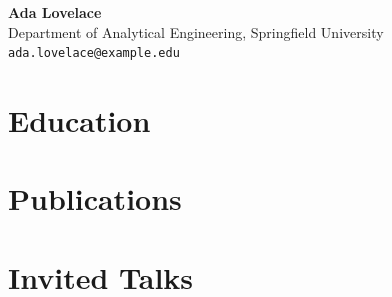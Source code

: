 \documentclass[11pt]{article}
\begin{document}
\begin{center}
  {\LARGE\bfseries Ada Lovelace}\\[2pt]
  Department of Analytical Engineering, Springfield University\\
  \texttt{ada.lovelace@example.edu}
\end{center}

\section*{Education}
\nocite{schoolPhD,degreePhD}
\printbibliography[heading=none,resetnumbers=true,check=Education]

\section*{Publications}
\nocite{cvArticleOne,cvArticleTwo}
\printbibliography[heading=none,resetnumbers=true,env=numbered,type=article]

\section*{Invited Talks}
\nocite{cvTalkOne}
\printbibliography[heading=none,resetnumbers=true,check=Presentation]
\end{document}
